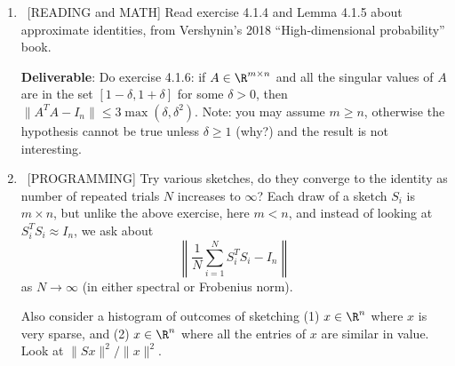 \documentclass[10pt, letterpaper]{scrartcl}
\begin{document}
\begin{enumerate}[align=left, leftmargin=*, label=\sffamily\bfseries Problem \arabic*:]   
 
    \item \ [READING and MATH] Read exercise 4.1.4 and Lemma 4.1.5 about approximate identities, from Vershynin's 2018 ``High-dimensional probability'' book. 
    
    \textbf{Deliverable}:
    Do exercise 4.1.6: if $A\in \R^{m \times n}$ and all the singular values of $A$ are in the set $[1-\delta,1+\delta]$ for some $\delta>0$, 
    then $\|A^TA - I_n \| \le 3 \max \left( \delta,\delta^2\right)$.  
    Note: you may assume $m\ge n$, otherwise the hypothesis cannot be true unless $\delta \ge 1$ (why?) and the result is not interesting.
    
         
    \item \ [PROGRAMMING] Try various sketches, do they converge to the identity  as number of repeated trials $N$ increases to $\infty$?
    Each draw of a sketch $S_i$ is $m \times n$, but unlike the above exercise, here $m < n$, and instead of looking at $S_i^TS_i \approx I_n$, we ask about
    \begin{equation}\label{eq:err}
    \left\| \frac{1}{N}\sum_{i=1}^N S_i^TS_i  - I_n \right\|
    \end{equation}
    as $N\rightarrow \infty$ (in either spectral or Frobenius norm).
    
    Also consider a histogram of outcomes of sketching (1) $x\in \R^n$ where $x$ is very sparse, and (2) $x \in \R^n$ where all the entries of $x$ are similar in value. Look at $\|Sx\|^2/\|x\|^2$.
    

\end{enumerate}
\end{document}
